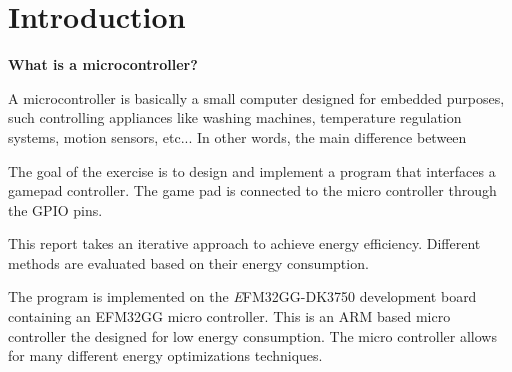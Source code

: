 \section{Introduction}
{\bf What is a microcontroller?}

	A microcontroller is basically a small computer designed for embedded purposes, such controlling appliances like washing machines, temperature regulation systems, motion sensors, etc... In other words, the main difference between 


The goal of the exercise is to design and implement a program that interfaces a gamepad controller. The game pad is connected to the micro controller through the GPIO pins.  





This report takes an iterative approach to achieve energy efficiency. Different methods are evaluated based on their energy consumption. 

The program is implemented on the \emph EFM32GG-DK3750 development board containing an EFM32GG micro controller. This is an ARM based micro controller the designed for low energy consumption. The micro controller allows for many different energy optimizations techniques.    


